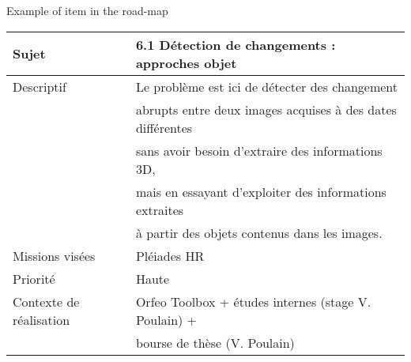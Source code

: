 \documentclass[8pt]{beamer}
\begin{document}
\begin{frame}[label=sec-3]{Example of item in the road-map}
\begin{center}
\begin{tabular}{ll}
Sujet & 6.1 Détection de changements : approches objet\\
\hline
Descriptif & Le problème est ici de détecter des changement\\
 & abrupts entre deux images acquises à des dates différentes\\
 & sans avoir besoin d'extraire des informations 3D,\\
 & mais en essayant d'exploiter des informations extraites\\
 & à partir des objets contenus dans les images.\\
\hline
Missions visées & Pléiades HR\\
\hline
Priorité & Haute\\
\hline
Contexte de réalisation & Orfeo Toolbox + études internes (stage V. Poulain) +\\
 & bourse de thèse (V. Poulain)\\
\hline
\end{tabular}
\end{center}
\end{frame}
\end{document}
